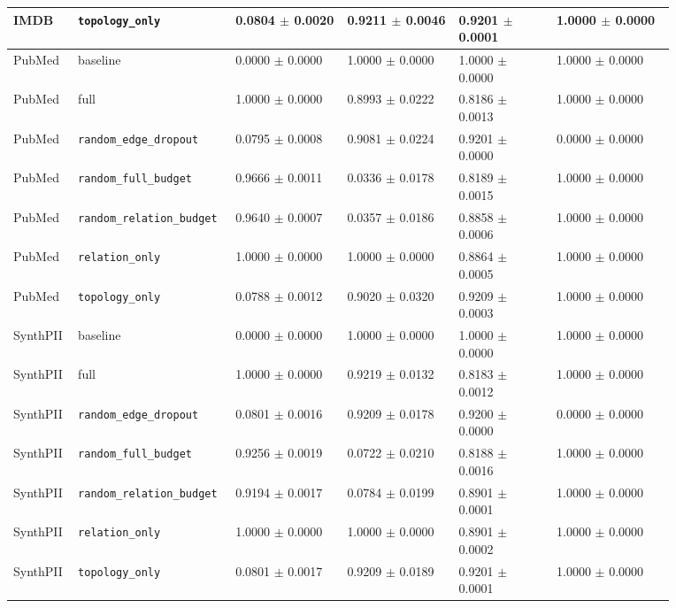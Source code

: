 \documentclass[preprint,12pt]{elsarticle}
\begin{document}
\begin{landscape}
\begin{longtable}{|L{0.08\linewidth}|L{0.16\linewidth}|C{0.16\linewidth}|C{0.16\linewidth}|C{0.14\linewidth}|C{0.17\linewidth}|}
IMDB & \nolinkurl{topology_only} & 0.0804 $\pm$ 0.0020 & 0.9211 $\pm$ 0.0046 & 0.9201 $\pm$ 0.0001 & 1.0000 $\pm$ 0.0000 \\ \hline
PubMed & baseline & 0.0000 $\pm$ 0.0000 & 1.0000 $\pm$ 0.0000 & 1.0000 $\pm$ 0.0000 & 1.0000 $\pm$ 0.0000 \\ \hline
PubMed & full & 1.0000 $\pm$ 0.0000 & 0.8993 $\pm$ 0.0222 & 0.8186 $\pm$ 0.0013 & 1.0000 $\pm$ 0.0000 \\ \hline
PubMed & \nolinkurl{random_edge_dropout} & 0.0795 $\pm$ 0.0008 & 0.9081 $\pm$ 0.0224 & 0.9201 $\pm$ 0.0000 & 0.0000 $\pm$ 0.0000 \\ \hline
PubMed & \nolinkurl{random_full_budget} & 0.9666 $\pm$ 0.0011 & 0.0336 $\pm$ 0.0178 & 0.8189 $\pm$ 0.0015 & 1.0000 $\pm$ 0.0000 \\ \hline
PubMed & \nolinkurl{random_relation_budget} & 0.9640 $\pm$ 0.0007 & 0.0357 $\pm$ 0.0186 & 0.8858 $\pm$ 0.0006 & 1.0000 $\pm$ 0.0000 \\ \hline
PubMed & \nolinkurl{relation_only} & 1.0000 $\pm$ 0.0000 & 1.0000 $\pm$ 0.0000 & 0.8864 $\pm$ 0.0005 & 1.0000 $\pm$ 0.0000 \\ \hline
PubMed & \nolinkurl{topology_only} & 0.0788 $\pm$ 0.0012 & 0.9020 $\pm$ 0.0320 & 0.9209 $\pm$ 0.0003 & 1.0000 $\pm$ 0.0000 \\ \hline
SynthPII & baseline & 0.0000 $\pm$ 0.0000 & 1.0000 $\pm$ 0.0000 & 1.0000 $\pm$ 0.0000 & 1.0000 $\pm$ 0.0000 \\ \hline
SynthPII & full & 1.0000 $\pm$ 0.0000 & 0.9219 $\pm$ 0.0132 & 0.8183 $\pm$ 0.0012 & 1.0000 $\pm$ 0.0000 \\ \hline
SynthPII & \nolinkurl{random_edge_dropout} & 0.0801 $\pm$ 0.0016 & 0.9209 $\pm$ 0.0178 & 0.9200 $\pm$ 0.0000 & 0.0000 $\pm$ 0.0000 \\ \hline
SynthPII & \nolinkurl{random_full_budget} & 0.9256 $\pm$ 0.0019 & 0.0722 $\pm$ 0.0210 & 0.8188 $\pm$ 0.0016 & 1.0000 $\pm$ 0.0000 \\ \hline
SynthPII & \nolinkurl{random_relation_budget} & 0.9194 $\pm$ 0.0017 & 0.0784 $\pm$ 0.0199 & 0.8901 $\pm$ 0.0001 & 1.0000 $\pm$ 0.0000 \\ \hline
SynthPII & \nolinkurl{relation_only} & 1.0000 $\pm$ 0.0000 & 1.0000 $\pm$ 0.0000 & 0.8901 $\pm$ 0.0002 & 1.0000 $\pm$ 0.0000 \\ \hline
SynthPII & \nolinkurl{topology_only} & 0.0801 $\pm$ 0.0017 & 0.9209 $\pm$ 0.0189 & 0.9201 $\pm$ 0.0001 & 1.0000 $\pm$ 0.0000 \\ \hline
\end{longtable}
\endgroup
\end{landscape}
\end{document}
